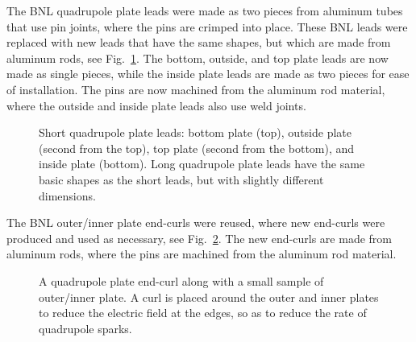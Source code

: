 The BNL quadrupole plate leads were made as two pieces from aluminum tubes that use pin joints, where the pins are crimped into place. These BNL leads were replaced with new leads that have the same shapes, but which are made from aluminum rods, see Fig.~\ref{fig:plate_leads}. The bottom, outside, and top plate leads are now made as single pieces, while the inside plate leads are made as two pieces for ease of installation. The pins are now machined from the aluminum rod material, where the outside and inside plate leads also use weld joints. 
\begin{figure}[]
	\centering
	\caption{Short quadrupole plate leads: bottom plate (top), outside plate (second from the top), top plate (second from the bottom), and inside plate (bottom). Long quadrupole plate leads have the same basic shapes as the short leads, but with slightly different dimensions.}\label{fig:plate_leads}
\end{figure}

The BNL outer/inner plate end-curls were reused, where new end-curls were produced and used as necessary, see Fig.~\ref{fig:plate_end_curl}. The new end-curls are made from aluminum rods, where the pins are machined from the aluminum rod material.
\begin{figure}[]
	\centering
	\caption{A quadrupole plate end-curl along with a small sample of outer/inner plate. A curl is placed around the outer and inner plates to reduce the electric field at the edges, so as to reduce the rate of quadrupole sparks.}\label{fig:plate_end_curl}
\end{figure}


